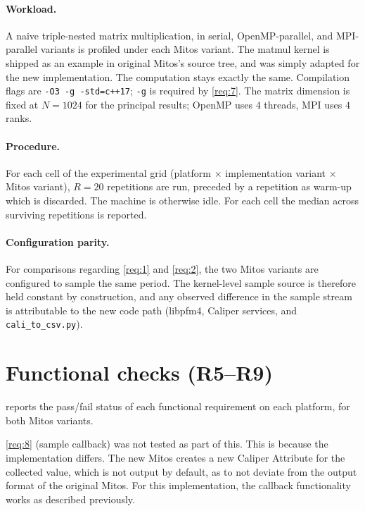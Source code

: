 \paragraph{Workload.} A naive triple-nested matrix multiplication, in serial, OpenMP-parallel, and MPI-parallel variants is profiled under each Mitos variant. The matmul kernel is shipped as an example in original Mitos's source tree, and was simply adapted for the new implementation. The computation stays exactly the same. Compilation flags are \texttt{-O3 -g -std=c++17}; \texttt{-g} is required by \ref{req:7}. The matrix dimension is fixed at $N = 1024$ for the principal results; OpenMP uses $4$ threads, MPI uses $4$ ranks.

\paragraph{Procedure.} For each cell of the experimental grid (platform $\times$ implementation variant $\times$ Mitos variant), $R = 20$ repetitions are run, preceded by a repetition as warm-up which is discarded. The machine is otherwise idle. For each cell the median across surviving repetitions is reported.

\paragraph{Configuration parity.} For comparisons regarding \ref{req:1} and \ref{req:2}, the two Mitos variants are configured to sample the same period. The kernel-level sample source is therefore held constant by construction, and any observed difference in the sample stream is attributable to the new code path (libpfm4, Caliper services, and \texttt{cali\_to\_csv.py}).

\section{Functional checks (R5--R9)}\label{sec:eval-functional}

 reports the pass/fail status of each functional requirement on each platform, for both Mitos variants.

\ref{req:8} (sample callback) was not tested as part of this. This is because the implementation differs. The new Mitos creates a new Caliper Attribute for the collected value, which is not output by default, as to not deviate from the output format of the original Mitos.
For this implementation, the callback functionality works as described previously.

